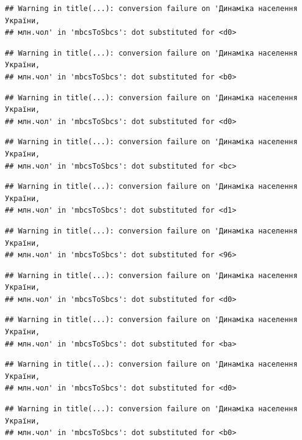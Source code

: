 \documentclass[
]{article}
\begin{document}
\begin{verbatim}
## Warning in title(...): conversion failure on 'Динаміка населення України,
## млн.чол' in 'mbcsToSbcs': dot substituted for <d0>
\end{verbatim}

\begin{verbatim}
## Warning in title(...): conversion failure on 'Динаміка населення України,
## млн.чол' in 'mbcsToSbcs': dot substituted for <b0>
\end{verbatim}

\begin{verbatim}
## Warning in title(...): conversion failure on 'Динаміка населення України,
## млн.чол' in 'mbcsToSbcs': dot substituted for <d0>
\end{verbatim}

\begin{verbatim}
## Warning in title(...): conversion failure on 'Динаміка населення України,
## млн.чол' in 'mbcsToSbcs': dot substituted for <bc>
\end{verbatim}

\begin{verbatim}
## Warning in title(...): conversion failure on 'Динаміка населення України,
## млн.чол' in 'mbcsToSbcs': dot substituted for <d1>
\end{verbatim}

\begin{verbatim}
## Warning in title(...): conversion failure on 'Динаміка населення України,
## млн.чол' in 'mbcsToSbcs': dot substituted for <96>
\end{verbatim}

\begin{verbatim}
## Warning in title(...): conversion failure on 'Динаміка населення України,
## млн.чол' in 'mbcsToSbcs': dot substituted for <d0>
\end{verbatim}

\begin{verbatim}
## Warning in title(...): conversion failure on 'Динаміка населення України,
## млн.чол' in 'mbcsToSbcs': dot substituted for <ba>
\end{verbatim}

\begin{verbatim}
## Warning in title(...): conversion failure on 'Динаміка населення України,
## млн.чол' in 'mbcsToSbcs': dot substituted for <d0>
\end{verbatim}

\begin{verbatim}
## Warning in title(...): conversion failure on 'Динаміка населення України,
## млн.чол' in 'mbcsToSbcs': dot substituted for <b0>
\end{verbatim}
\end{document}
